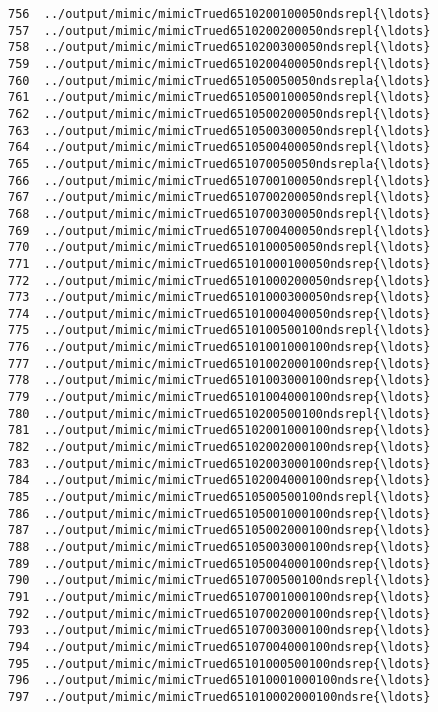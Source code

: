 \documentclass[11pt]{article}
\begin{document}
\begin{Verbatim}[commandchars=\\\{\}]
756  ../output/mimic/mimicTrued6510200100050ndsrepl{\ldots}  
757  ../output/mimic/mimicTrued6510200200050ndsrepl{\ldots}  
758  ../output/mimic/mimicTrued6510200300050ndsrepl{\ldots}  
759  ../output/mimic/mimicTrued6510200400050ndsrepl{\ldots}  
760  ../output/mimic/mimicTrued651050050050ndsrepla{\ldots}  
761  ../output/mimic/mimicTrued6510500100050ndsrepl{\ldots}  
762  ../output/mimic/mimicTrued6510500200050ndsrepl{\ldots}  
763  ../output/mimic/mimicTrued6510500300050ndsrepl{\ldots}  
764  ../output/mimic/mimicTrued6510500400050ndsrepl{\ldots}  
765  ../output/mimic/mimicTrued651070050050ndsrepla{\ldots}  
766  ../output/mimic/mimicTrued6510700100050ndsrepl{\ldots}  
767  ../output/mimic/mimicTrued6510700200050ndsrepl{\ldots}  
768  ../output/mimic/mimicTrued6510700300050ndsrepl{\ldots}  
769  ../output/mimic/mimicTrued6510700400050ndsrepl{\ldots}  
770  ../output/mimic/mimicTrued6510100050050ndsrepl{\ldots}  
771  ../output/mimic/mimicTrued65101000100050ndsrep{\ldots}  
772  ../output/mimic/mimicTrued65101000200050ndsrep{\ldots}  
773  ../output/mimic/mimicTrued65101000300050ndsrep{\ldots}  
774  ../output/mimic/mimicTrued65101000400050ndsrep{\ldots}  
775  ../output/mimic/mimicTrued6510100500100ndsrepl{\ldots}  
776  ../output/mimic/mimicTrued65101001000100ndsrep{\ldots}  
777  ../output/mimic/mimicTrued65101002000100ndsrep{\ldots}  
778  ../output/mimic/mimicTrued65101003000100ndsrep{\ldots}  
779  ../output/mimic/mimicTrued65101004000100ndsrep{\ldots}  
780  ../output/mimic/mimicTrued6510200500100ndsrepl{\ldots}  
781  ../output/mimic/mimicTrued65102001000100ndsrep{\ldots}  
782  ../output/mimic/mimicTrued65102002000100ndsrep{\ldots}  
783  ../output/mimic/mimicTrued65102003000100ndsrep{\ldots}  
784  ../output/mimic/mimicTrued65102004000100ndsrep{\ldots}  
785  ../output/mimic/mimicTrued6510500500100ndsrepl{\ldots}  
786  ../output/mimic/mimicTrued65105001000100ndsrep{\ldots}  
787  ../output/mimic/mimicTrued65105002000100ndsrep{\ldots}  
788  ../output/mimic/mimicTrued65105003000100ndsrep{\ldots}  
789  ../output/mimic/mimicTrued65105004000100ndsrep{\ldots}  
790  ../output/mimic/mimicTrued6510700500100ndsrepl{\ldots}  
791  ../output/mimic/mimicTrued65107001000100ndsrep{\ldots}  
792  ../output/mimic/mimicTrued65107002000100ndsrep{\ldots}  
793  ../output/mimic/mimicTrued65107003000100ndsrep{\ldots}  
794  ../output/mimic/mimicTrued65107004000100ndsrep{\ldots}  
795  ../output/mimic/mimicTrued65101000500100ndsrep{\ldots}  
796  ../output/mimic/mimicTrued651010001000100ndsre{\ldots}  
797  ../output/mimic/mimicTrued651010002000100ndsre{\ldots}  

\end{Verbatim}
\end{document}
